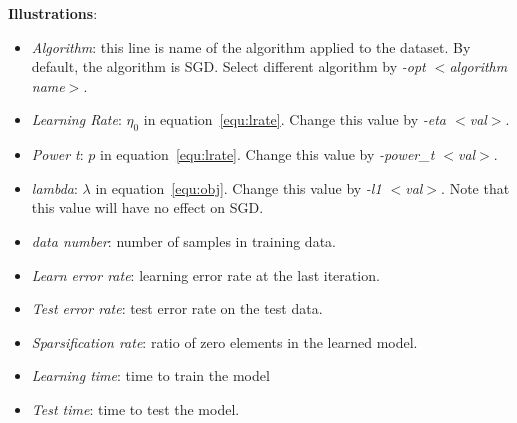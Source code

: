\documentclass[11pt,a4paper]{article}
\newlength{\wideitemsep}
\let\olditem\item
\renewcommand{\item}{\setlength{\itemsep}{\wideitemsep}\olditem}
\begin{document}
\textbf{Illustrations}:
\begin{itemize}
    \item \emph{Algorithm}: this line is name of the algorithm applied to the dataset.
        By default, the algorithm is SGD. Select different algorithm by
        \emph{-opt $<$algorithm name$>$}. 
    \item \emph{Learning Rate}: $\eta_0$ in equation~\eqref{equ:lrate}. Change
        this value by \emph{-eta $<$val$>$}.
    \item \emph{Power t}: $p$ in equation~\eqref{equ:lrate}. Change this value
        by \emph{-power\_t $<$val$>$}.
    \item \emph{lambda}: $\lambda$ in equation~\eqref{equ:obj}. Change this
        value by \emph{-l1 $<$val$>$}. Note that this value will have no effect on
        SGD.
    \item \emph{data number}: number of samples in training data.
    \item \emph{Learn error rate}: learning error rate at the last iteration.
    \item \emph{Test error rate}: test error rate on the test data.
    \item \emph{Sparsification rate}: ratio of zero elements in the learned
        model.
    \item \emph{Learning time}: time to train the model
    \item \emph{Test time}: time to test the model.
\end{itemize}
\end{document}
